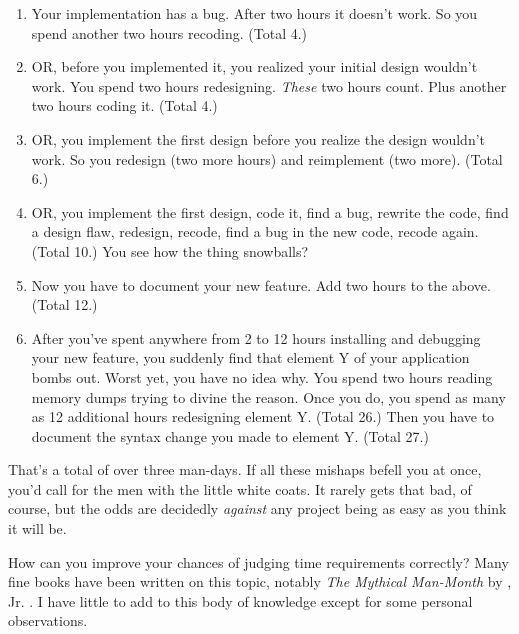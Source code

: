\begin{enumerate}
\item Your implementation has a bug. After two hours it doesn't work.
So you spend another two hours recoding. (Total 4.)
\item OR, before you implemented it, you realized your initial design
wouldn't work. You spend two hours redesigning. \emph{These} two hours
count. Plus another two hours coding it. (Total 4.)
\item OR, you implement the first design before you realize the design
wouldn't work. So you redesign (two more hours) and reimplement (two
more). (Total 6.)
\item OR, you implement the first design, code it, find a bug, rewrite
the code, find a design flaw, redesign, recode, find a bug in the new
code, recode again. (Total 10.)
You see how the thing snowballs?
\item Now you have to document your new feature. Add two hours to the
above. (Total 12.)
\item After you've spent anywhere from 2 to 12 hours installing and
debugging your new feature, you suddenly find that element Y of your
application bombs out. Worst yet, you have no idea why. You spend two
hours reading memory dumps trying to divine the reason. Once you do,
you spend as many as 12 additional hours redesigning element Y. (Total
26.) Then you have to document the syntax change you made to element
Y. (Total 27.)
\end{enumerate}

\noindent That's a total of over three man-days. If all these mishaps
befell you at once, you'd call for the men with the little white
coats. It rarely gets that bad, of course, but the odds are decidedly
\emph{against} any project being as easy as you think it will be.

How can you improve your chances of judging time requirements
correctly? Many fine books have been written on this topic, notably
\emph{The Mythical Man-Month} by , Jr.
\cite{brooks75}.%
%
I have little to add to this body of knowledge except for some
personal observations.

